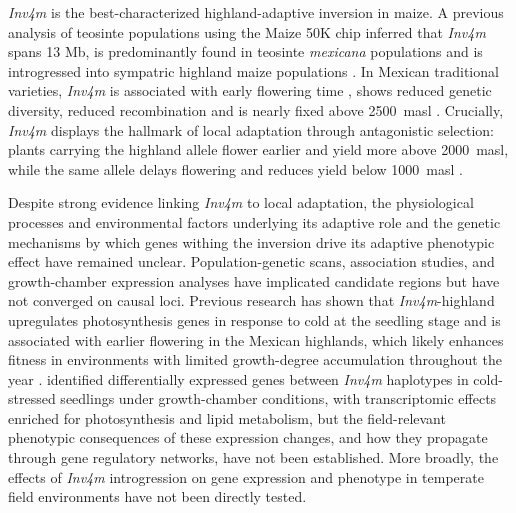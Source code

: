 \documentclass[9pt,twocolumn,twoside]{rilabRxiv}
\newcommand{\mex}{\textit{mexicana}\xspace}
\newcommand{\invfour}{\textit{Inv4m}\xspace}
\begin{document}
\invfour is the best-characterized highland-adaptive inversion in maize.
A previous analysis of teosinte populations using the Maize 50K chip inferred that \invfour spans 13 Mb, is predominantly found in teosinte \mex populations \citep{pyhajarvi2013} and is introgressed into sympatric highland maize populations \citep{pyhajarvi2013,calfee2021-mr,hufford2013-gs}.
In Mexican traditional varieties, \invfour is associated with early flowering time \citep{romero_navarro2017-cn}, shows reduced genetic diversity, reduced recombination \citep{gonzalez-segovia2019-jy} and is nearly fixed above 2500~masl \citep{crow2020}.
Crucially, \invfour displays the hallmark of local adaptation through
antagonistic selection: plants carrying the highland allele flower
earlier and yield more above 2000~masl, while the same allele delays
flowering and reduces yield below 1000~masl \citep{crow2020}.

Despite strong evidence linking \invfour to local adaptation, the physiological processes and environmental factors underlying its adaptive role and the genetic mechanisms by which genes withing the inversion drive its adaptive phenotypic effect have remained unclear.
Population-genetic scans, association studies, and growth-chamber expression analyses have implicated candidate regions but have not converged on causal loci.
Previous research has shown that \invfour-highland upregulates photosynthesis genes in response to cold at the seedling stage \citep{crow2020} and is associated with earlier flowering in the Mexican highlands, which likely enhances fitness in environments with limited growth-degree accumulation throughout the year \citep{romero_navarro2017-cn, eagles1994, giauffret2000}.
\cite{crow2020} identified differentially expressed genes between
\invfour haplotypes in cold-stressed seedlings under growth-chamber
conditions, with transcriptomic effects enriched for photosynthesis and
lipid metabolism, but the field-relevant phenotypic consequences of
these expression changes, and how they propagate through gene regulatory
networks, have not been established.
More broadly, the effects of \invfour introgression on gene expression and phenotype in temperate field environments have not been directly tested.
\end{document}

